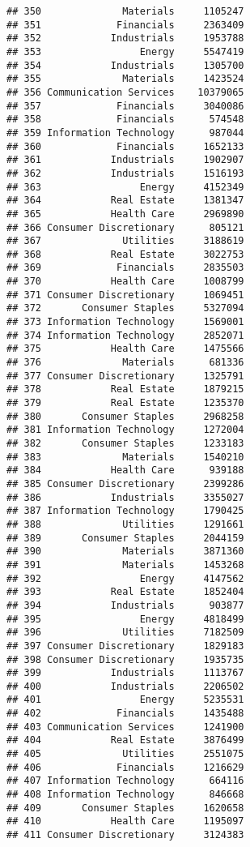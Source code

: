 \documentclass[
]{article}
\begin{document}
\begin{verbatim}
## 350              Materials     1105247
## 351             Financials     2363409
## 352            Industrials     1953788
## 353                 Energy     5547419
## 354            Industrials     1305700
## 355              Materials     1423524
## 356 Communication Services    10379065
## 357             Financials     3040086
## 358             Financials      574548
## 359 Information Technology      987044
## 360             Financials     1652133
## 361            Industrials     1902907
## 362            Industrials     1516193
## 363                 Energy     4152349
## 364            Real Estate     1381347
## 365            Health Care     2969890
## 366 Consumer Discretionary      805121
## 367              Utilities     3188619
## 368            Real Estate     3022753
## 369             Financials     2835503
## 370            Health Care     1008799
## 371 Consumer Discretionary     1069451
## 372       Consumer Staples     5327094
## 373 Information Technology     1569001
## 374 Information Technology     2852071
## 375            Health Care     1475566
## 376              Materials      681336
## 377 Consumer Discretionary     1325791
## 378            Real Estate     1879215
## 379            Real Estate     1235370
## 380       Consumer Staples     2968258
## 381 Information Technology     1272004
## 382       Consumer Staples     1233183
## 383              Materials     1540210
## 384            Health Care      939188
## 385 Consumer Discretionary     2399286
## 386            Industrials     3355027
## 387 Information Technology     1790425
## 388              Utilities     1291661
## 389       Consumer Staples     2044159
## 390              Materials     3871360
## 391              Materials     1453268
## 392                 Energy     4147562
## 393            Real Estate     1852404
## 394            Industrials      903877
## 395                 Energy     4818499
## 396              Utilities     7182509
## 397 Consumer Discretionary     1829183
## 398 Consumer Discretionary     1935735
## 399            Industrials     1113767
## 400            Industrials     2206502
## 401                 Energy     5235531
## 402             Financials     1435488
## 403 Communication Services     1241900
## 404            Real Estate     3876499
## 405              Utilities     2551075
## 406             Financials     1216629
## 407 Information Technology      664116
## 408 Information Technology      846668
## 409       Consumer Staples     1620658
## 410            Health Care     1195097
## 411 Consumer Discretionary     3124383

\end{verbatim}
\end{document}
